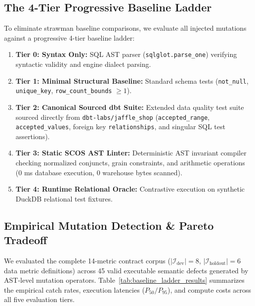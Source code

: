 \documentclass[11pt,a4paper]{article}
\begin{document}
\subsection{The 4-Tier Progressive Baseline Ladder}
To eliminate strawman baseline comparisons, we evaluate all injected mutations against a progressive 4-tier baseline ladder:
\begin{enumerate}[noitemsep]
    \item \textbf{Tier 0: Syntax Only:} SQL AST parser (\texttt{sqlglot.parse\_one}) verifying syntactic validity and engine dialect parsing.
    \item \textbf{Tier 1: Minimal Structural Baseline:} Standard schema tests (\texttt{not\_null}, \texttt{unique\_key}, \texttt{row\_count\_bounds} $\ge 1$).
    \item \textbf{Tier 2: Canonical Sourced dbt Suite:} Extended data quality test suite sourced directly from \texttt{dbt-labs/jaffle\_shop} (\texttt{accepted\_range}, \texttt{accepted\_values}, foreign key \texttt{relationships}, and singular SQL test assertions).
    \item \textbf{Tier 3: Static SCOS AST Linter:} Deterministic AST invariant compiler checking normalized conjuncts, grain constraints, and arithmetic operations (0 ms database execution, 0 warehouse bytes scanned).
    \item \textbf{Tier 4: Runtime Relational Oracle:} Contrastive execution on synthetic DuckDB relational test fixtures.
\end{enumerate}

\subsection{Empirical Mutation Detection \& Pareto Tradeoff}
We evaluated the complete 14-metric contract corpus ($|\mathcal{I}_{\text{dev}}| = 8$, $|\mathcal{I}_{\text{holdout}}| = 6$ data metric definitions) across 45 valid executable semantic defects generated by AST-level mutation operators. Table~\ref{tab:baseline_ladder_results} summarizes the empirical catch rates, execution latencies ($P_{50} / P_{95}$), and compute costs across all five evaluation tiers.
\end{document}
